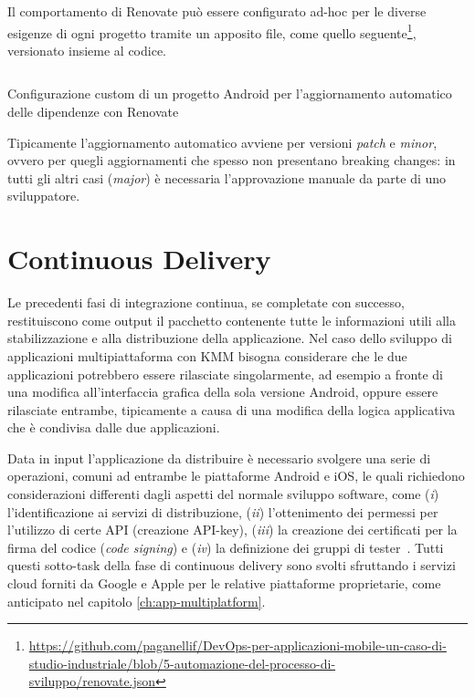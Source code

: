 Il comportamento di Renovate può essere configurato ad-hoc per le diverse esigenze di ogni progetto tramite un apposito file, come quello seguente\footnote{\href{https://github.com/paganellif/DevOps-per-applicazioni-mobile-un-caso-di-studio-industriale/blob/5-automazione-del-processo-di-sviluppo/renovate.json}{https://github.com/paganellif/DevOps-per-applicazioni-mobile-un-caso-di-studio-industriale/blob/5-automazione-del-processo-di-sviluppo/renovate.json}}, versionato insieme al codice. 

\begin{listing}[H]
    \inputminted{json}{code/renovate.json}
    \caption{Configurazione custom di un progetto Android per l'aggiornamento automatico delle dipendenze con Renovate}
\end{listing}

Tipicamente l'aggiornamento automatico avviene per versioni \textit{patch} e \textit{minor}, ovvero per quegli aggiornamenti che spesso non presentano breaking changes: in tutti gli altri casi (\textit{major}) è necessaria l'approvazione manuale da parte di uno sviluppatore.

\section{Continuous Delivery}
Le precedenti fasi di integrazione continua, se completate con successo, restituiscono come output il pacchetto contenente tutte le informazioni utili alla stabilizzazione e alla distribuzione della applicazione. Nel caso dello sviluppo di applicazioni multipiattaforma con KMM bisogna considerare che le due applicazioni potrebbero essere rilasciate singolarmente, ad esempio a fronte di una modifica all'interfaccia grafica della sola versione Android, oppure essere rilasciate entrambe, tipicamente a causa di una modifica della logica applicativa che è condivisa dalle due applicazioni.

Data in input l'applicazione da distribuire è necessario svolgere una serie di operazioni, comuni ad entrambe le piattaforme Android e iOS, le quali richiedono considerazioni differenti dagli aspetti del normale sviluppo software, come (\textit{i}) l'identificazione ai servizi di distribuzione, (\textit{ii}) l'ottenimento dei permessi per l'utilizzo di certe API (creazione API-key), (\textit{iii}) la creazione dei certificati per la firma del codice (\textit{code signing}) e (\textit{iv}) la definizione dei gruppi di tester~\cite{mednieks2011programming}. Tutti questi sotto-task della fase di continuous delivery sono svolti sfruttando i servizi cloud forniti da Google e Apple per le relative piattaforme proprietarie, come anticipato nel capitolo \ref{ch:app-multiplatform}.

